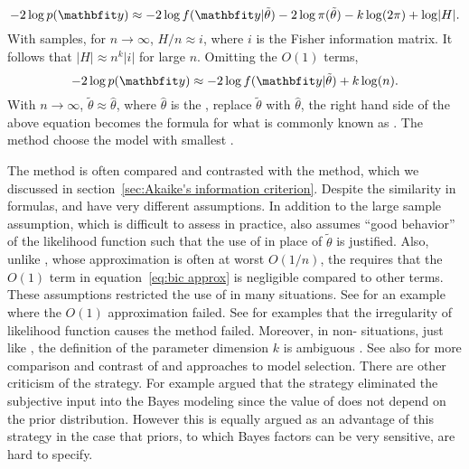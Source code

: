 \begin{equation}
  -2\log p(\data) \approx
  -2\log f(\data|\tilde\theta) - 2\log\pi(\tilde\theta) - k\log(2\pi) + \log\lvert H \rvert.
  \label{eq:bic approx}
\end{equation}
With \iid samples, for $n\to\infty$, $H/n \approx i$, where $i$ is the Fisher
information matrix. It follows that $\lvert H \rvert \approx n^k \lvert i
\rvert$ for large $n$. Omitting the $O(1)$ terms,
\begin{equation}
  -2\log p(\data) \approx -2\log f(\data|\tilde\theta) + k\log(n).
\end{equation}
With $n\to\infty$, $\tilde\theta\approx\hat{\theta}$, where $\hat{\theta}$ is
the \mle, replace $\tilde\theta$ with $\hat{\theta}$, the right hand side of the
above equation becomes the formula for what is commonly known as \bic. The
\bic method choose the model with smallest \bic.

The \bic method is often compared and contrasted with the \aic method, which
we discussed in section~\ref{sec:Akaike's information criterion}. Despite the
similarity in formulas, \aic and \bic have very different assumptions. In
addition to the large sample assumption, which is difficult to assess in
practice, \bic also assumes ``good behavior'' of the likelihood function such
that the use of \mle in place of $\tilde\theta$ is justified. Also, unlike
\aic, whose approximation is often at worst $O(1/n)$, the \bic requires that
the $O(1)$ term in equation~\eqref{eq:bic approx} is negligible compared to
other terms. These assumptions restricted the use of \bic in many situations.
See \textcite{Gelfand:1994ux} for an example where the $O(1)$ approximation
failed. See \textcite{Berger:2001uy} for examples that the irregularity of
likelihood function causes the \bic method failed. Moreover, in non-\iid
situations, just like \aic, the definition of the parameter dimension $k$ is
ambiguous \parencite{Spiegelhalter:1998uc, Kass:1995vb}. See also
\textcite[][chap.~5 and chap.~6]{Burnham:2002wc} for more comparison and
contrast of \aic and \bic approaches to model selection. There are other
criticism of the \bic strategy. For example
\textcite[][chap.~7]{Robert:2007tc} argued that the \bic strategy eliminated
the subjective input into the Bayes modeling since the value of \bic does not
depend on the prior distribution. However this is equally argued as an
advantage of this strategy in the case that priors, to which Bayes factors can
be very sensitive, are hard to specify.

\ifx\inthesis\undefined
\printbibliography
\else\relax\fi
